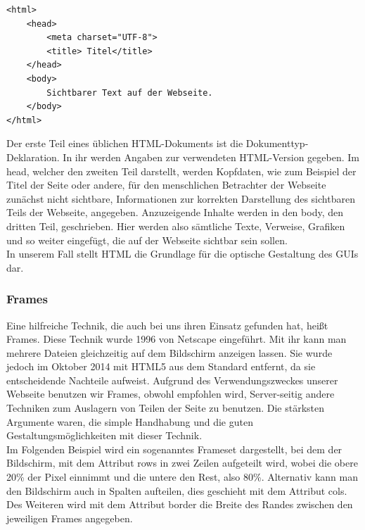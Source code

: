 \documentclass[12pt,a4paper,bibliography=totocnumbered,listof=totocnumbered]{scrartcl}
\begin{document}
\vspace{1em}
\begin{lstlisting}[caption= Beispiel für ein einfaches HTML-Dokument, label=lst:HTML]
<html>
	<head>
		<meta charset="UTF-8">		
		<title> Titel</title>
	</head>
	<body>
		Sichtbarer Text auf der Webseite.
	</body>
</html>
\end{lstlisting}

Der erste Teil eines üblichen HTML-Dokuments ist die Dokumenttyp-Deklaration. In ihr werden Angaben zur verwendeten HTML-Version gegeben. Im \glqq head\grqq , welcher den zweiten Teil darstellt, werden  Kopfdaten, wie zum Beispiel der Titel der Seite oder andere, für den menschlichen Betrachter der Webseite zunächst nicht sichtbare, Informationen zur korrekten Darstellung des sichtbaren Teils der Webseite, angegeben.\cite{HTML/Kopfdaten} Anzuzeigende Inhalte werden in den \glqq body\grqq{}, den dritten Teil, geschrieben. Hier werden also sämtliche Texte, Verweise, Grafiken und so weiter eingefügt, die auf der Webseite sichtbar sein sollen.\cite{HTML/Dokumentstruktur_und_Aufbau} \\
In unserem Fall stellt HTML die Grundlage für die optische Gestaltung des GUIs dar.

\subsubsection{Frames}
\label{sec:Frames}
Eine hilfreiche Technik, die auch bei uns ihren Einsatz gefunden hat, heißt Frames. Diese Technik wurde 1996 von Netscape eingeführt. Mit ihr kann man mehrere Dateien gleichzeitig auf dem Bildschirm anzeigen lassen.\cite{HTML/Frames} Sie wurde jedoch im Oktober 2014 mit HTML5\cite{HTML5} aus dem Standard entfernt, da sie entscheidende Nachteile aufweist. Aufgrund des Verwendungszweckes unserer Webseite benutzen wir Frames, obwohl empfohlen wird, Server-seitig andere Techniken zum Auslagern von Teilen der Seite zu benutzen.\cite{HTML/Frames} Die stärksten Argumente waren, die simple Handhabung und die guten Gestaltungsmöglichkeiten mit dieser Technik. \\
Im Folgenden Beispiel wird ein sogenanntes Frameset dargestellt, bei dem der Bildschirm, mit dem Attribut \glqq rows\grqq{} in zwei Zeilen aufgeteilt wird, wobei die obere 20\% der Pixel einnimmt und die untere den Rest, also 80\%. Alternativ kann man den Bildschirm auch in Spalten aufteilen, dies geschieht mit dem Attribut \glqq cols\grqq . Des Weiteren wird mit dem Attribut \glqq border\grqq{} die Breite des Randes zwischen den jeweiligen Frames angegeben.
\end{document}
